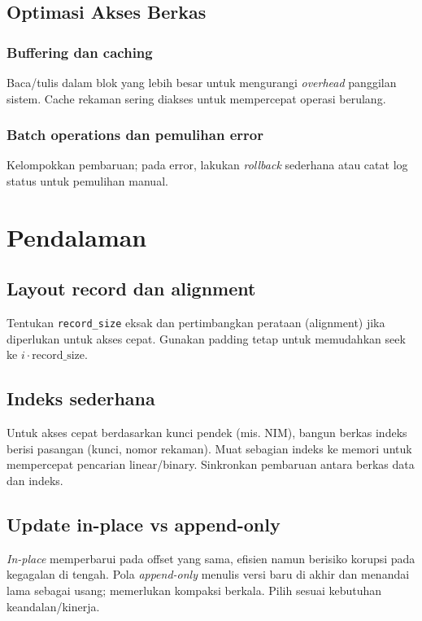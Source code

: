 \subsection{Optimasi Akses Berkas}
\subsubsection{Buffering dan caching}
Baca/tulis dalam blok yang lebih besar untuk mengurangi \textit{overhead} panggilan sistem. Cache rekaman sering diakses untuk mempercepat operasi berulang.

\subsubsection{Batch operations dan pemulihan error}
Kelompokkan pembaruan; pada error, lakukan \textit{rollback} sederhana atau catat log status untuk pemulihan manual.

\section{Pendalaman}\label{sec:randomio-pendalaman}
\subsection{Layout record dan alignment}
Tentukan \texttt{record\_size} eksak dan pertimbangkan perataan (alignment) jika diperlukan untuk akses cepat. Gunakan padding tetap untuk memudahkan seek ke \(i\cdot \text{record\_size}\). \cite{osdev_wiki}

\subsection{Indeks sederhana}
Untuk akses cepat berdasarkan kunci pendek (mis. NIM), bangun berkas indeks berisi pasangan (kunci, nomor rekaman). Muat sebagian indeks ke memori untuk mempercepat pencarian linear/binary. Sinkronkan pembaruan antara berkas data dan indeks. \cite{osdev_wiki}

\subsection{Update in-place vs append-only}
\textit{In-place} memperbarui pada offset yang sama, efisien namun berisiko korupsi pada kegagalan di tengah. Pola \textit{append-only} menulis versi baru di akhir dan menandai lama sebagai usang; memerlukan kompaksi berkala. Pilih sesuai kebutuhan keandalan/kinerja. \cite{osdev_wiki}

